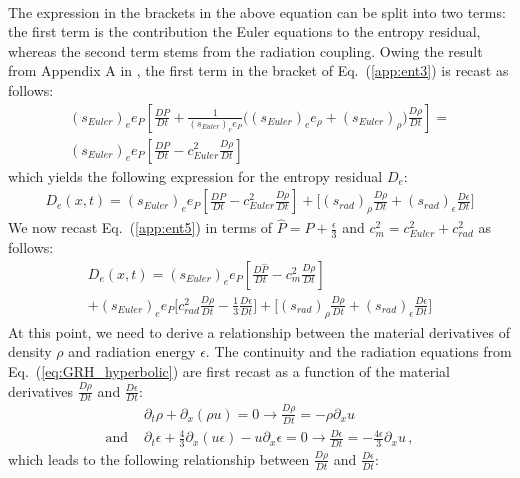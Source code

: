 \documentclass[review]{elsarticle}
\newcommand{\eqt}[1]{Eq.~(\ref{#1})}                     %
\begin{document}
\begin{appendices}
\begin{multline}
\end{multline}
%
The expression in the brackets in the above equation can be split into two terms: the first term is the contribution the Euler equations to the entropy residual, whereas the second term stems from the radiation coupling. Owing the result from Appendix A in \cite{Marco_paper_low_mach}, the first term in the bracket of \eqt{app:ent3} is recast as follows:
%
\begin{multline}
(s_{Euler})_e e_P\left[ \frac{D P}{Dt} + \frac{1}{(s_{Euler})_e e_P}\Big( (s_{Euler})_e e_\rho + (s_{Euler})_\rho \Big) \frac{D \rho}{Dt} \right]  = \\ (s_{Euler})_e e_P\left[ \frac{D P}{Dt} -c^2_{Euler} \frac{D \rho}{Dt} \right] \nonumber
\end{multline}
% 
which yields the following expression for the entropy residual $D_e$:
%
\begin{multline}\label{app:ent5}
D_e(x,t) = (s_{Euler})_e e_P\left[ \frac{D P}{Dt} -c^2_{Euler} \frac{D \rho}{Dt} \right] + \Big[ (s_{rad})_\rho \frac{D \rho}{Dt} + (s_{rad})_\epsilon \frac{D \epsilon}{Dt} \Big]
\end{multline}
%
We now recast \eqt{app:ent5} in terms of $\hat{P} = P + \frac{\epsilon}{3}$ and $c^2_m = c^2_{Euler} + c^2_{rad}$ as follows:
%
\begin{multline}\label{app:ent6}
D_e(x,t) = (s_{Euler})_e e_P\left[ \frac{D \hat{P}}{Dt} - c^2_m \frac{D \rho}{Dt} \right] \\ + (s_{Euler})_e e_P \Big[ c^2_{rad}\frac{D \rho}{Dt} - \frac{1}{3}\frac{D \epsilon}{Dt} \Big] +  \Big[ (s_{rad})_\rho \frac{D \rho}{Dt} + (s_{rad})_\epsilon \frac{D \epsilon}{Dt} \Big]
\end{multline}
%
At this point, we need to derive a relationship between the material derivatives of density $\rho$ and radiation energy $\epsilon$. The continuity and the radiation equations from \eqt{eq:GRH_hyperbolic} are first recast as a function of the material derivatives $\frac{D \rho}{D t}$ and $\frac{D \epsilon}{D t}$:
%
\begin{align}
&\partial_t \rho +  \partial_x (\rho u) = 0 \rightarrow \frac{D \rho}{D t} = - \rho \partial_x u \nonumber \\
\text{and }
&\partial_t \epsilon + \frac{4}{3}\partial_x (u \epsilon) - u \partial_x \epsilon = 0 \rightarrow \frac{D \epsilon}{D t} = -\frac{4 \epsilon}{3} \partial_x u \, , \nonumber
\end{align}
%
which leads to the following relationship between $\frac{D \rho}{D t}$ and $\frac{D \epsilon}{D t}$:

\end{appendices}
\end{document}
